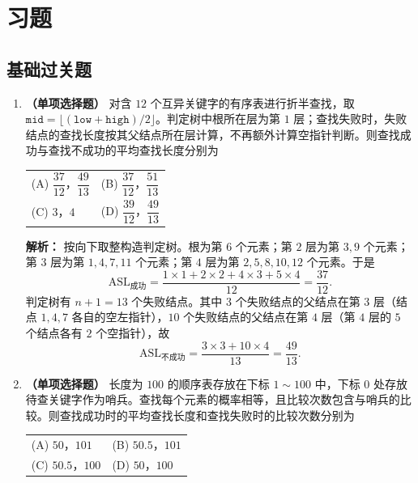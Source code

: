 \section{习题}

\subsection{基础过关题}

\begin{enumerate}

\item \textbf{（单项选择题）} 对含 $12$ 个互异关键字的有序表进行折半查找，取
$\texttt{mid}=\lfloor(\texttt{low}+\texttt{high})/2\rfloor$。判定树中根所在层为第 $1$ 层；查找失败时，失败结点的查找长度按其父结点所在层计算，不再额外计算空指针判断。则查找成功与查找不成功的平均查找长度分别为
\begin{center}
\begin{tabular}{ll}
(A) $\dfrac{37}{12}$，$\dfrac{49}{13}$ & (B) $\dfrac{37}{12}$，$\dfrac{51}{13}$ \\[8pt]
(C) $3$，$4$ & (D) $\dfrac{39}{12}$，$\dfrac{49}{13}$
\end{tabular}
\end{center}

\ifshowsolutions\par\noindent\textbf{解析：} 按向下取整构造判定树。根为第 $6$ 个元素；第 $2$ 层为第 $3,9$ 个元素；第 $3$ 层为第 $1,4,7,11$ 个元素；第 $4$ 层为第 $2,5,8,10,12$ 个元素。于是
\[
\mathrm{ASL}_{\text{成功}}=\frac{1\times1+2\times2+4\times3+5\times4}{12}
=\frac{37}{12}.
\]
判定树有 $n+1=13$ 个失败结点。其中 $3$ 个失败结点的父结点在第 $3$ 层（结点 $1,4,7$ 各自的空左指针），$10$ 个失败结点的父结点在第 $4$ 层（第 $4$ 层的 $5$ 个结点各有 $2$ 个空指针），故
\[
\mathrm{ASL}_{\text{不成功}}=\frac{3\times3+10\times4}{13}=\frac{49}{13}.
\]
\par\noindent{}\else \answerarea \fi

\vspace{6pt}

\item \textbf{（单项选择题）} 长度为 $100$ 的顺序表存放在下标 $1\sim100$ 中，下标 $0$ 处存放待查关键字作为哨兵。查找每个元素的概率相等，且比较次数包含与哨兵的比较。则查找成功时的平均查找长度和查找失败时的比较次数分别为
\begin{center}
\begin{tabular}{ll}
(A) $50$，$101$ & (B) $50.5$，$101$ \\[6pt]
(C) $50.5$，$100$ & (D) $50$，$100$
\end{tabular}
\end{center}


\end{enumerate}

